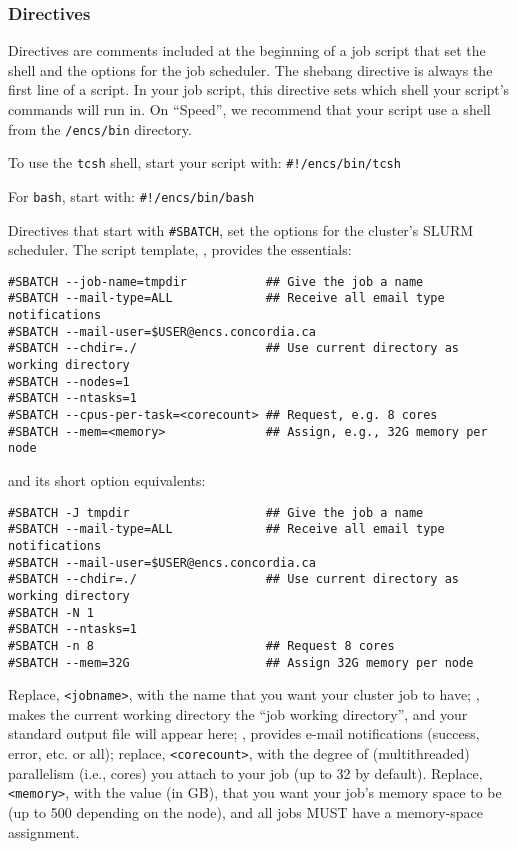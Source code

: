 \subsubsection{Directives}
\label{sect:directives}

Directives are comments included at the beginning of a job script that set the shell 
and the options for the job scheduler. 
%
The shebang directive is always the first line of a script. In your job script, 
this directive sets which shell your script's commands will run in. On ``Speed'', 
we recommend that your script use a shell from the \texttt{/encs/bin} directory. 

To use the \texttt{tcsh} shell, start your script with: \verb|#!/encs/bin/tcsh|

For \texttt{bash}, start with: \verb|#!/encs/bin/bash|

Directives that start with \verb|#SBATCH|, set the options for the cluster's 
SLURM scheduler. The script template, , 
provides the essentials:

\begin{verbatim}
#SBATCH --job-name=tmpdir           ## Give the job a name
#SBATCH --mail-type=ALL             ## Receive all email type notifications
#SBATCH --mail-user=$USER@encs.concordia.ca
#SBATCH --chdir=./                  ## Use current directory as working directory
#SBATCH --nodes=1
#SBATCH --ntasks=1
#SBATCH --cpus-per-task=<corecount> ## Request, e.g. 8 cores
#SBATCH --mem=<memory>              ## Assign, e.g., 32G memory per node 
\end{verbatim}

and its short option equivalents:

\begin{verbatim}
#SBATCH -J tmpdir                   ## Give the job a name
#SBATCH --mail-type=ALL             ## Receive all email type notifications
#SBATCH --mail-user=$USER@encs.concordia.ca
#SBATCH --chdir=./                  ## Use current directory as working directory
#SBATCH -N 1
#SBATCH --ntasks=1
#SBATCH -n 8                        ## Request 8 cores
#SBATCH --mem=32G                   ## Assign 32G memory per node 
\end{verbatim}

Replace, \verb+<jobname>+, with the name that you want your cluster job to have;
, makes the current working directory the ``job working directory'',
and your standard output file will appear here; , provides e-mail
notifications (success, error, etc. or all); replace, \verb+<corecount>+, with the degree of
(multithreaded) parallelism (i.e., cores) you attach to your job (up to 32 by default).
Replace, \verb+<memory>+, with the value (in GB), that you want 
your job's memory space to be (up to 500 depending on the node), and all jobs MUST have a memory-space 
assignment.

